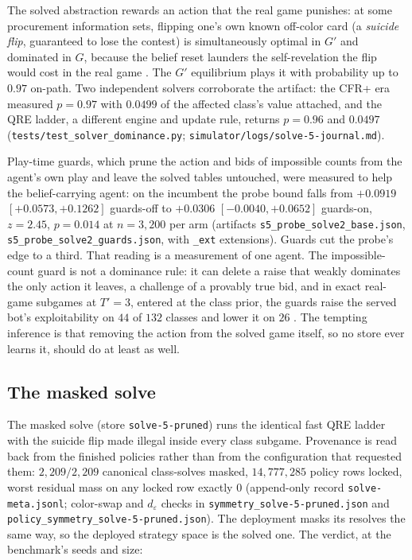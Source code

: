 \documentclass[11pt]{article}
\theoremstyle{plain}
\theoremstyle{definition}
\theoremstyle{remark}
\newcommand{\code}[1]{\texttt{\small #1}}
\newcommand{\game}{\ensuremath{G}}
\newcommand{\gp}{\ensuremath{G'}}
\newcommand{\deps}{\ensuremath{d_\varepsilon}}
\begin{document}
The solved abstraction rewards an action that the real game punishes:
at some procurement information sets, flipping one's own known
off-color card (a \emph{suicide flip}, guaranteed to lose the contest)
is simultaneously optimal in $\gp$ and dominated in $\game$, because
the belief reset launders the self-revelation the flip would cost in
the real game \cite{rb2}. The $\gp$ equilibrium plays it with
probability up to $0.97$ on-path. Two independent solvers corroborate
the artifact: the CFR+ era measured $p=0.97$ with $0.0499$ of the
affected class's value attached, and the QRE ladder, a different engine
and update rule, returns $p=0.96$ and $0.0497$
(\code{tests/test\_solver\_dominance.py};
\code{simulator/logs/solve-5-journal.md}).

Play-time guards, which prune the action and bids of impossible counts
from the agent's own play and leave the solved tables untouched, were
measured to help the belief-carrying agent: on the incumbent the probe
bound falls from $+0.0919$ $[+0.0573,+0.1262]$ guards-off to
$+0.0306$ $[-0.0040,+0.0652]$ guards-on, $z=2.45$, $p=0.014$ at
$n=3{,}200$ per arm (artifacts \code{s5\_probe\_solve2\_base.json},
\code{s5\_probe\_solve2\_guards.json}, with \code{\_ext} extensions).
Guards cut the probe's edge to a third. That reading is a
measurement of one agent. The impossible-count guard is not a dominance
rule: it can delete a raise that weakly dominates the only action it
leaves, a challenge of a provably true bid, and in exact real-game
subgames at $T'=3$, entered at the class prior, the guards raise the
served bot's exploitability on $44$ of $132$ classes and lower it on
$26$ \cite{rb2}. The tempting inference is that
removing the action from the solved game itself, so no store ever
learns it, should do at least as well.

\subsection{The masked solve}

The masked solve (store \code{solve-5-pruned}) runs the identical fast
QRE ladder with the suicide flip made illegal inside every class
subgame. Provenance is read back from the finished policies rather than
from the configuration that requested them: $2{,}209/2{,}209$ canonical
class-solves masked, $14{,}777{,}285$ policy rows locked, worst
residual mass on any locked row exactly $0$ (append-only record
\code{solve-meta.jsonl}; color-swap and $\deps$ checks in
\code{symmetry\_solve-5-pruned.json} and
\code{policy\_symmetry\_solve-5-pruned.json}). The deployment masks its
resolves the same way, so the deployed strategy space is the solved
one. The verdict, at the benchmark's seeds and size:
\end{document}
